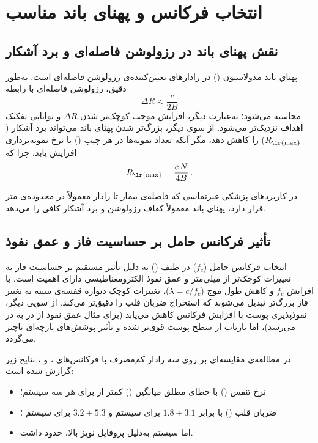 \section{انتخاب فرکانس و پهنای باند مناسب}
\label{sec:frequency-band-selection}

\subsection{نقش پهنای باند در رزولوشن فاصله‌ای و برد آشکار}
پهناي باند مدولاسیون () در رادارهای  تعیین‌کننده‌ی رزولوشن فاصله‌ای است. به‌طور دقیق، رزولوشن فاصله‌ای با رابطه
\begin{equation}
\Delta R \approx \frac{c}{2B}
\end{equation}
محاسبه می‌شود؛ به‌عبارت دیگر، افزایش  موجب کوچک‌تر شدن $\Delta R$ و توانایی تفکیک اهداف نزدیک‌تر می‌شود. از سوی دیگر، بزرگ‌تر شدن پهنای باند می‌تواند برد آشکار ($R_\text{\lr{max}}$) را کاهش دهد، مگر آنکه تعداد نمونه‌ها در هر چیپ () یا نرخ نمونه‌برداری افزایش یابد، چرا که
\begin{equation}
R_\text{\lr{max}} = \frac{c\,N}{4B}\,.
\end{equation}

در کاربردهای پزشکی غیرتماسی که فاصله‌ی بیمار تا رادار معمولاً در محدوده‌ی  متر قرار دارد، پهنای باند  معمولاً کفاف رزولوشن  و برد آشکار کافی را می‌دهد.

\subsection{تأثیر فرکانس حامل بر حساسیت فاز و عمق نفوذ}
انتخاب فرکانس حامل ($f_c$) در طیف  () به دلیل تأثیر مستقیم بر حساسیت فاز به تغییرات  کوچک‌تر از میلی‌متر و عمق نفوذ الکترومغناطیسی دارای اهمیت است. با افزایش $f_c$ و کاهش طول موج ($\lambda = c/f_c$)، تغییرات کوچک دیواره قفسه‌ی سینه به تغییر فاز بزرگ‌تر تبدیل می‌شوند که استخراج ضربان قلب را دقیق‌تر می‌کند. از سویی دیگر، نفوذپذیری پوست با افزایش فرکانس کاهش می‌یابد (برای مثال عمق نفوذ از \lr{2.7 mm} در  به \lr{0.5 mm} در  می‌رسد)، اما بازتاب از سطح پوست قوی‌تر شده و تأثیر پوشش‌های پارچه‌ای ناچیز می‌گردد.

در مطالعه‌ی مقایسه‌ای بر روی سه رادار کم‌مصرف  با فرکانس‌های ،  و ، نتایج زیر گزارش شده است:
\begin{itemize}
  \item نرخ تنفس () با خطای مطلق میانگین () کمتر از  برای هر سه سیستم؛
  \item ضربان قلب () با  برابر $1.8 \pm 3.1$  برای سیستم  و $3.2 \pm 5.3$  برای سیستم ؛
  \item اما سیستم  به‌دلیل پروفایل نویز بالا،  حدود  داشت.
\end{itemize}

